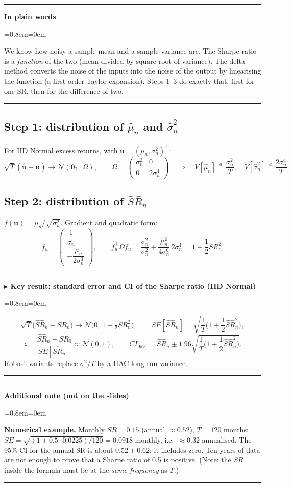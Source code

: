 \documentclass[11pt,a4paper]{report}
\newenvironment{notebox}[1]
  {\par\medskip\Needspace{6\baselineskip}\noindent\rule{\linewidth}{0.4pt}\par\nopagebreak
   \noindent\textbf{#1}\par\nopagebreak
   \begin{list}{}{\leftmargin=0.8em\rightmargin=0em\topsep=2pt}\item[]}
  {\end{list}\nopagebreak\noindent\rule{\linewidth}{0.4pt}\par\medskip}
\newenvironment{keybox}[1][]{\begin{notebox}{$\blacktriangleright$ Key result#1}}{\end{notebox}}
\newenvironment{plainbox}{\begin{notebox}{In plain words}}{\end{notebox}}
\newenvironment{addnote}{\begin{notebox}{Additional note (not on the slides)}}{\end{notebox}}
\newcommand{\T}{^{\top}}
\begin{document}
\begin{plainbox}
We know how noisy a sample mean and a sample variance are. The Sharpe ratio is
a \emph{function} of the two (mean divided by square root of variance). The delta
method converts the noise of the inputs into the noise of the output by
linearising the function (a first-order Taylor expansion). Steps 1--3 do exactly
that, first for one SR, then for the difference of two.
\end{plainbox}
\subsection{Step 1: distribution of $\hat\mu_n$ and $\hat\sigma^2_n$}
For IID Normal excess returns, with $\bm u=(\mu_n,\sigma_n^2)\T$:
\[
\sqrt T(\hat{\bm u}-\bm u)\to\mathcal N\!\left(\bm 0_2,\ \Omega\right),\qquad
\Omega=\begin{pmatrix}\sigma_n^2&0\\0&2\sigma_n^4\end{pmatrix}
\quad\Rightarrow\quad
V[\hat\mu_n]\overset{a}{=}\frac{\sigma_n^2}{T},\quad V[\hat\sigma_n^2]\overset{a}{=}\frac{2\sigma_n^4}{T}.
\]

\subsection{Step 2: distribution of $\widehat{SR}_n$}
$f(\bm u)=\mu_n/\sqrt{\sigma_n^2}$. Gradient and quadratic form:
\[
f_u=\begin{pmatrix}\dfrac1{\sigma_n}\\[6pt]-\dfrac{\mu_n}{2\sigma_n^3}\end{pmatrix},\qquad
f_u\T\Omega f_u=\frac{\sigma_n^2}{\sigma_n^2}+\frac{\mu_n^2}{4\sigma_n^6}\,2\sigma_n^4
=1+\frac12 SR_n^2 .
\]
\begin{keybox}[: standard error and CI of the Sharpe ratio (IID Normal)]
\[
\sqrt T\big(\widehat{SR}_n-SR_n\big)\to\mathcal N\!\Big(0,\,1+\tfrac12SR_n^2\Big),\qquad
SE[\widehat{SR}_n]=\sqrt{\frac1T\Big(1+\frac12\widehat{SR}_n^2\Big)},
\]
\[
z=\frac{\widehat{SR}_n-SR_0}{SE[\widehat{SR}_n]}\approx\mathcal N(0,1),\qquad
CI_{95\%}=\widehat{SR}_n\pm1.96\sqrt{\frac1T\Big(1+\frac12\widehat{SR}_n^2\Big)}.
\]
Robust variants replace $\sigma^2/T$ by a HAC long-run variance.
\end{keybox}
\begin{addnote}
\textbf{Numerical example.} Monthly $SR=0.15$ (annual $\approx0.52$), $T=120$ months:
$SE=\sqrt{(1+0.5\cdot0.0225)/120}=0.0918$ monthly, i.e.\ $\approx0.32$ annualised.
The 95\% CI for the annual SR is about $0.52\pm0.62$: it includes zero. Ten years
of data are not enough to prove that a Sharpe ratio of 0.5 is positive.
(Note: the $SR$ inside the formula must be at the \emph{same frequency} as $T$.)
\end{addnote}
\end{document}
